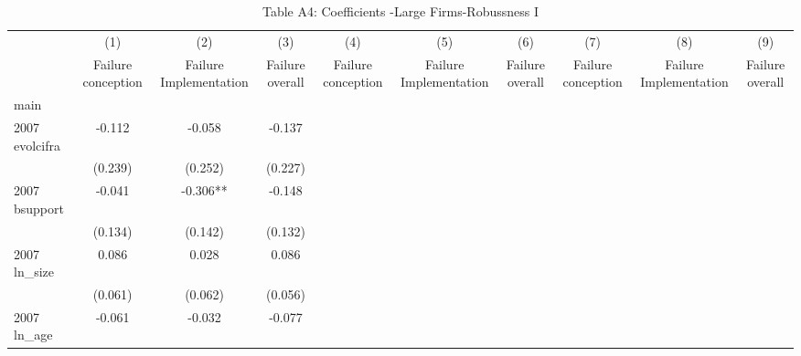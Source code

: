 \begin{table}[htbp]\centering
\def\sym#1{\ifmmode^{#1}\else\(^{#1}\)\fi}
\caption{{Table A4: Coefficients -Large Firms-Robussness I}}
\begin{tabular}{l*{9}{c}}
\hline\hline
                    &\multicolumn{1}{c}{(1)}&\multicolumn{1}{c}{(2)}&\multicolumn{1}{c}{(3)}&\multicolumn{1}{c}{(4)}&\multicolumn{1}{c}{(5)}&\multicolumn{1}{c}{(6)}&\multicolumn{1}{c}{(7)}&\multicolumn{1}{c}{(8)}&\multicolumn{1}{c}{(9)}\\
                    &\multicolumn{1}{c}{Failure conception}&\multicolumn{1}{c}{Failure Implementation}&\multicolumn{1}{c}{Failure overall}&\multicolumn{1}{c}{Failure conception}&\multicolumn{1}{c}{Failure Implementation}&\multicolumn{1}{c}{Failure overall}&\multicolumn{1}{c}{Failure conception}&\multicolumn{1}{c}{Failure Implementation}&\multicolumn{1}{c}{Failure overall}\\
\hline
main                &               &               &               &               &               &               &               &               &               \\
2007 evolcifra      &      -0.112   &      -0.058   &      -0.137   &               &               &               &               &               &               \\
                    &     (0.239)   &     (0.252)   &     (0.227)   &               &               &               &               &               &               \\
2007 bsupport       &      -0.041   &      -0.306** &      -0.148   &               &               &               &               &               &               \\
                    &     (0.134)   &     (0.142)   &     (0.132)   &               &               &               &               &               &               \\
2007 ln\_size        &       0.086   &       0.028   &       0.086   &               &               &               &               &               &               \\
                    &     (0.061)   &     (0.062)   &     (0.056)   &               &               &               &               &               &               \\
2007 ln\_age         &      -0.061   &      -0.032   &      -0.077   &               &               &               &               &               &               \\

\end{tabular}
\end{table}
